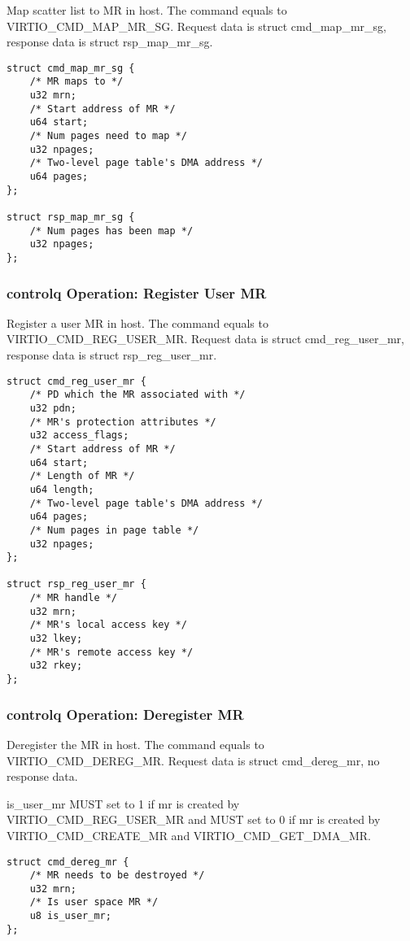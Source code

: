 Map scatter list to MR in host. The command equals to VIRTIO_CMD_MAP_MR_SG.
Request data is struct cmd_map_mr_sg, response data is struct rsp_map_mr_sg.

\begin{lstlisting}
struct cmd_map_mr_sg {
    /* MR maps to */
    u32 mrn;
    /* Start address of MR */
    u64 start;
    /* Num pages need to map */
    u32 npages;
    /* Two-level page table's DMA address */
    u64 pages;
};

struct rsp_map_mr_sg {
    /* Num pages has been map */
    u32 npages;
};
\end{lstlisting}

\subsubsection{controlq Operation: Register User MR}\label{sec:Device Types / RDMA Device / controlq Operation / Register User MR}

Register a user MR in host. The command equals to VIRTIO_CMD_REG_USER_MR.
Request data is struct cmd_reg_user_mr, response data is struct rsp_reg_user_mr.

\begin{lstlisting}
struct cmd_reg_user_mr {
    /* PD which the MR associated with */
    u32 pdn;
    /* MR's protection attributes */
    u32 access_flags;
    /* Start address of MR */
    u64 start;
    /* Length of MR */
    u64 length;
    /* Two-level page table's DMA address */
    u64 pages;
    /* Num pages in page table */
    u32 npages;
};

struct rsp_reg_user_mr {
    /* MR handle */
    u32 mrn;
    /* MR's local access key */
    u32 lkey;
    /* MR's remote access key */
    u32 rkey;
};
\end{lstlisting}

\subsubsection{controlq Operation: Deregister MR}\label{sec:Device Types / RDMA Device / controlq Operation / Deregister MR}

Deregister the MR in host. The command equals to VIRTIO_CMD_DEREG_MR.
Request data is struct cmd_dereg_mr, no response data.

is_user_mr MUST set to 1 if mr is created by VIRTIO_CMD_REG_USER_MR and
MUST set to 0 if mr is created by VIRTIO_CMD_CREATE_MR and VIRTIO_CMD_GET_DMA_MR.

\begin{lstlisting}
struct cmd_dereg_mr {
    /* MR needs to be destroyed */
    u32 mrn;
    /* Is user space MR */
    u8 is_user_mr;
};
\end{lstlisting}

